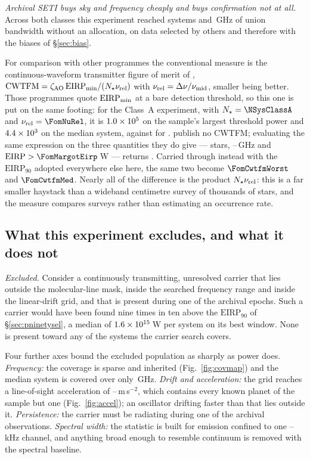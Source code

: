 \emph{Archival SETI buys sky and frequency cheaply and buys confirmation not
at all.} Across both classes this experiment reached \NSystems{} systems and
\UnionGHz\,GHz of union bandwidth without an allocation, on data selected
by others and therefore with the biases of \S\ref{sec:bias}.

For comparison with other programmes the conventional measure is the
continuous-waveform transmitter figure of merit of \citet{Enriquez2017},
$\mathrm{CWTFM}=\zeta_{\rm AO}\,\mathrm{EIRP}_{\rm min}/
(N_{\star}\nu_{\rm rel})$ with $\nu_{\rm rel}=\Delta\nu/\nu_{\rm mid}$,
smaller being better. Those programmes quote $\mathrm{EIRP}_{\rm min}$ at a
bare detection threshold, so this one is put on the same footing: for the
Class~A experiment, with $N_{\star}=\NSysClassA$ and
$\nu_{\rm rel}=\FomNuRel$, it is $1.0\times10^{5}$ on the sample's largest
threshold power and $4.4\times10^{3}$ on the median system, against
\FomLitEnriquez{} for \citet{Enriquez2017}. \citet{Margot2023} publish no
CWTFM; evaluating the same expression on the three quantities they do give
--- \FomMargotN{} stars, \FomMargotLo--\FomMargotHi\,GHz and
$\mathrm{EIRP}>\FomMargotEirp$\,W --- returns \FomLitMargot.
Carried through instead with the $\mathrm{EIRP}_{90}$
adopted everywhere else here, the same two become $\FomCwtfmWorst$ and
$\FomCwtfmMed$. Nearly all of
the difference is the product $N_{\star}\nu_{\rm rel}$: this is a far smaller
haystack than a wideband centimetre survey of thousands of stars, and the
measure compares surveys rather than estimating an occurrence rate.

\subsection{What this experiment excludes, and what it does not}
\label{sec:excludes}

\noindent\emph{Excluded.} Consider a continuously transmitting, unresolved
carrier that lies outside the molecular-line mask, inside the searched
frequency range and inside the linear-drift grid, and that is present during
one of the archival epochs. Such a carrier would have been found nine times
in ten above the $\mathrm{EIRP}_{90}$ of \S\ref{sec:pninetysel}, a median of
$1.6\times10^{15}$\,W per system on its best window. None is present toward
any of the \NSysClassA{} systems the carrier search covers.

Four further axes bound the excluded population as sharply as power does.
\emph{Frequency:} the coverage is sparse and inherited (Fig.~\ref{fig:covmap})
and the median system is covered over only \SysUnionAMed\,GHz. \emph{Drift and
acceleration:} the grid reaches a line-of-sight acceleration of
\AccelCeilMed--\AccelCeilMax\,m\,s$^{-2}$, which contains every known planet
of the sample but one (Fig.~\ref{fig:accel}); an oscillator drifting faster
than that lies outside it. \emph{Persistence:} the carrier must be radiating
during one of the archival observations. \emph{Spectral width:} the statistic
is built for emission confined to one \ChanLoA--\ChanHiA\,kHz channel, and
anything broad enough to resemble continuum is removed with the spectral
baseline.

